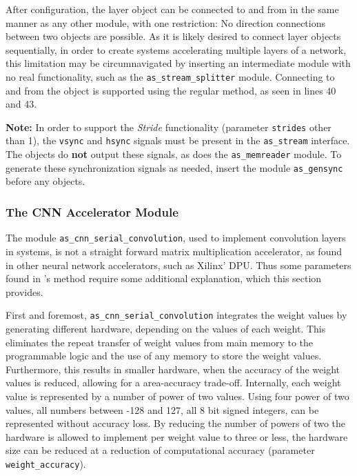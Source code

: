 After configuration, the layer object can be connected to and from in the same manner as any other module, with one restriction: No direction connections between two  objects are possible. As it is likely desired to connect layer objects sequentially, in order to create systems accelerating multiple layers of a network, this limitation may be circumnavigated by inserting an intermediate module with no real functionality, such as the \texttt{as\_stream\_splitter} module.
Connecting to and from the  object is supported using the regular  method, as seen in lines 40 and 43.

\textbf{Note:} In order to support the \textit{Stride} functionality (parameter \texttt{strides} other than 1), the \texttt{vsync} and \texttt{hsync} signals must be present in the \texttt{as\_stream} interface.
The  objects do \textbf{not} output these signals, as does the \texttt{as\_memreader} module.
To generate these synchronization signals as needed, insert the module \texttt{as\_gensync} before any  objects.

\subsubsection*{The \asterics CNN Accelerator Module}
\label{ssec:06-02-cnn_accel_module}

The module \texttt{as\_cnn\_serial\_convolution}, used to implement convolution layers in \asterics systems, is not a straight forward matrix multiplication accelerator, as found in other neural network accelerators, such as Xilinx' DPU.
Thus some parameters found in 's  method require some additional explanation, which this section provides.

First and foremost, \texttt{as\_cnn\_serial\_convolution} integrates the weight values by generating different hardware, depending on the values of each weight.
This eliminates the repeat transfer of weight values from main memory to the programmable logic and the use of any memory to store the weight values.
Furthermore, this results in smaller hardware, when the accuracy of the weight values is reduced, allowing for a area-accuracy trade-off.
Internally, each weight value is represented by a number of power of two values.
Using four power of two values, all numbers between -128 and 127, all 8 bit signed integers, can be represented without accuracy loss.
By reducing the number of powers of two the hardware is allowed to implement per weight value to three or less, the hardware size can be reduced at a reduction of computational accuracy (parameter  \texttt{weight\_accuracy}). 

